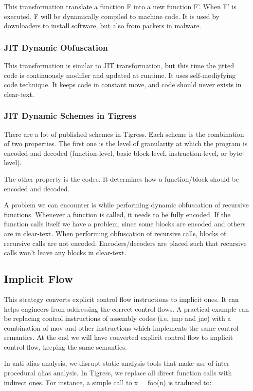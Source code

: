 This transformation translate a function F into a new function F'. When F' is executed, F will be dynamically compiled to machine code. It is used by downloaders to install software, but also from packers in malware.

\subsubsection{JIT Dynamic Obfuscation}

This transformation is similar to JIT transformation, but this time the jitted code is continuously modifier and updated at runtime. It uses self-modiyfying code technique. It keeps code in constant move, and code should never exists in clear-text. 

\subsubsection{JIT Dynamic Schemes in Tigress}

There are a lot of published schemes in Tigress. Each scheme is the combination of two properties. The first one is the level of granularity at which the program is encoded and decoded (function-level, basic block-level, instruction-level, or byte-level). 
\par 
The other property is the codec. It determines how a function/block should be encoded and decoded.

A problem we can encounter is while performing dynamic obfuscation of recursive functions. 
Whenever a function is called, it needs to be fully encoded. If the function calls itself we have a problem, since some blocks are encoded and others are in clear-text. When performing obfuscation of recursive calls, blocks of recursive calls are not encoded. 
Encoders/decoders are placed such that recursive calls won't leave any blocks in clear-text. 

\subsection{Implicit Flow}

This strategy converts explicit control flow instructions to implicit ones.
It can helps engineers from addressing the correct control flows. 
A practical example can be replacing control instructions of assembly codes (i.e. jmp and jne) with a combination of mov and other instructions which implements the same control semantics. At the end we will have converted explicit control flow to implicit control flow, keeping the same semantics. 
\par 
In anti-alias analysis, we disrupt static analysis tools that make use of inter-procedural alias analysis. In Tigress, we replace all direct function calls with indirect ones. 
For instance, a simple call to x = foo(n) is traduced to:

